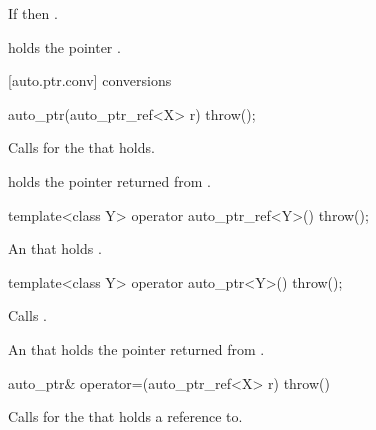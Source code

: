 \begin{itemdescr}
\pnum
\effects
If  then .

\pnum
\postconditions
{} holds the pointer .
\end{itemdescr}

[auto.ptr.conv]{ conversions}

%
\begin{itemdecl}
auto_ptr(auto_ptr_ref<X> r) throw();
\end{itemdecl}

\begin{itemdescr}
\pnum
\effects
Calls  for the   that  holds.

\pnum
\postconditions
{} holds the pointer returned from .
\end{itemdescr}

%
%
\begin{itemdecl}
template<class Y> operator auto_ptr_ref<Y>() throw();
\end{itemdecl}

\begin{itemdescr}
\pnum
\returns
An  that holds .
\end{itemdescr}

%
%
\begin{itemdecl}
template<class Y> operator auto_ptr<Y>() throw();
\end{itemdecl}

\begin{itemdescr}
\pnum
\effects
Calls .

\pnum
\returns
An  that holds the pointer returned from .
\end{itemdescr}

%
%
\begin{itemdecl}
auto_ptr& operator=(auto_ptr_ref<X> r) throw()
\end{itemdecl}

\begin{itemdescr}
\pnum
\effects
Calls  for the 
that  holds a reference to.

\pnum
\returns
{}
\end{itemdescr}

